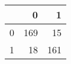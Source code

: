 \begin{tabular}{lrr}
\toprule
{} &    0 &    1 \\
\midrule
0 &  169 &   15 \\
1 &   18 &  161 \\
\bottomrule
\end{tabular}
